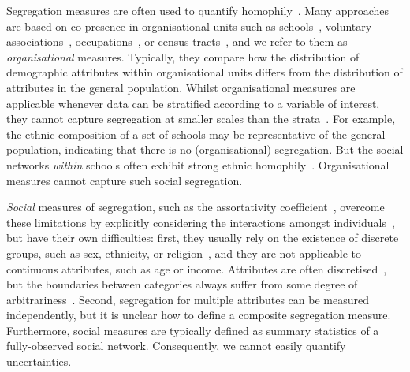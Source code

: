 \documentclass{scrartcl}
\begin{document}
Segregation measures are often used to quantify homophily~\cite{Rodriguez-Moral2016, Bojanowski2014}. Many approaches are based on co-presence in organisational units such as schools~\cite{Orfield2014}, voluntary associations~\cite{Popielarz1999}, occupations~\cite{Charles1995}, or census tracts~\cite{Reardon2004,Reardon2011}, and we refer to them as \emph{organisational} measures. Typically, they compare how the distribution of demographic attributes within organisational units differs from the distribution of attributes in the general population. Whilst organisational measures are applicable whenever data can be stratified according to a variable of interest, they cannot capture segregation at smaller scales than the strata~\cite{Blumenstock2013}. For example, the ethnic composition of a set of schools may be representative of the general population, indicating that there is no (organisational) segregation. But the social networks \emph{within} schools often exhibit strong ethnic homophily~\cite{Currarini2009,Moody2001}.
Organisational measures cannot capture such social segregation.

\emph{Social} measures of segregation, such as the assortativity coefficient~\cite{Newman2003a}, overcome these limitations by explicitly considering the interactions amongst individuals~\cite{Blumenstock2013}, but have their own difficulties: first, they usually rely on the existence of discrete groups, such as sex, ethnicity, or religion~\cite{Bojanowski2014}, and they are not applicable to continuous attributes, such as age or income. Attributes are often discretised~\cite{Lam-Morgan2012, Kalmijn2007, Kim2012},
but the boundaries between categories always suffer from some degree of arbitrariness~\cite{Reardon2004}. Second, segregation for multiple attributes can be measured independently, but it is unclear how to define a composite segregation measure. Furthermore, social measures are typically defined as summary statistics of a fully-observed social network. Consequently, we cannot easily quantify uncertainties. %
\end{document}
